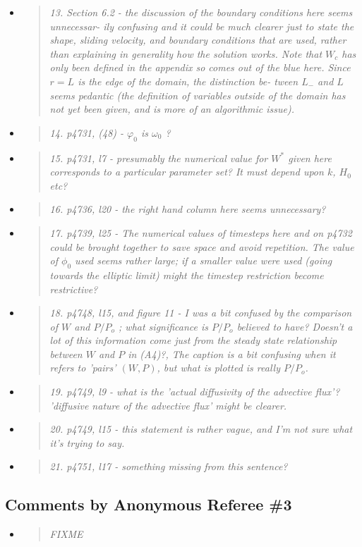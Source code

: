 \documentclass[11pt,reqno]{amsart}
\newcommand{\reply}[2]{
\medskip\medskip
\item  \begin{quote}
\emph{#1}
\end{quote}

\medskip
\noindent #2}
\begin{document}
\begin{itemize}
\reply{13. Section 6.2 - the discussion of the boundary conditions here seems unnecessar-
ily confusing and it could be much clearer just to state the shape, sliding velocity,
and boundary conditions that are used, rather than explaining in generality how
the solution works. Note that $W_c$ has only been defined in the appendix so comes
out of the blue here. Since $r = L$ is the edge of the domain, the distinction be-
tween $L_-$ and $L$ seems pedantic (the definition of variables outside of the domain
has not yet been given, and is more of an algorithmic issue).}
{}

\reply{14. p4731, (48) - $\varphi_0$ is $\omega_0$ ?}
{}

\reply{15. p4731, l7 - presumably the numerical value for $W^*$ given here corresponds to a
particular parameter set? It must depend upon $k$, $H_0$ etc?}
{}

\reply{16. p4736, l20 - the right hand column here seems unnecessary?}
{}

\reply{17. p4739, l25 - The numerical values of timesteps here and on p4732 could be
brought together to save space and avoid repetition. The value of $\phi_0$ used seems
rather large; if a smaller value were used (going towards the elliptic limit) might
the timestep restriction become restrictive?}
{}

\reply{18. p4748, l15, and figure 11 - I was a bit confused by the comparison of $W$ and $P/P_o$ ;
what significance is $P/P_o$ believed to have? Doesn't a lot of this information come
just from the steady state relationship between $W$ and $P$ in (A4)?, The caption is
a bit confusing when it refers to 'pairs' $(W,P)$, but what is plotted is really $P/P_o$.}
{}

\reply{19. p4749, l9 - what is the 'actual diffusivity of the advective flux'?  'diffusive nature of
the advective flux' might be clearer.}
{}

\reply{20. p4749, l15 - this statement is rather vague, and I'm not sure what it's trying to
say.}
{}

\reply{21. p4751, l17 - something missing from this sentence?}
{}
\end{itemize}



\subsection*{Comments by Anonymous Referee \#3}\begin{itemize}
\reply{FIXME}
{}

\end{itemize}
\end{document}
